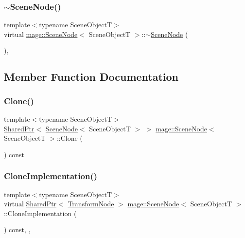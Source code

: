 \subsubsection{\texorpdfstring{$\sim$\+Scene\+Node()}{~SceneNode()}}
{\footnotesize\ttfamily template$<$typename Scene\+ObjectT$>$ \\
virtual \hyperlink{classmage_1_1_scene_node}{mage\+::\+Scene\+Node}$<$ Scene\+ObjectT $>$\+::$\sim$\hyperlink{classmage_1_1_scene_node}{Scene\+Node} (\begin{DoxyParamCaption}{ }\end{DoxyParamCaption})\hspace{0.3cm}{\ttfamily [virtual]}, {\ttfamily [default]}}



\subsection{Member Function Documentation}
\hypertarget{classmage_1_1_scene_node_a5cb20e0955c4afddcf7c2ecf79008e83}{}\label{classmage_1_1_scene_node_a5cb20e0955c4afddcf7c2ecf79008e83} 
\subsubsection{\texorpdfstring{Clone()}{Clone()}}
{\footnotesize\ttfamily template$<$typename Scene\+ObjectT$>$ \\
\hyperlink{namespacemage_a1e01ae66713838a7a67d30e44c67703e}{Shared\+Ptr}$<$ \hyperlink{classmage_1_1_scene_node}{Scene\+Node}$<$ Scene\+ObjectT $>$ $>$ \hyperlink{classmage_1_1_scene_node}{mage\+::\+Scene\+Node}$<$ Scene\+ObjectT $>$\+::Clone (\begin{DoxyParamCaption}{ }\end{DoxyParamCaption}) const}

\hypertarget{classmage_1_1_scene_node_a51ebb43d49e018665a181c863642a8bc}{}\label{classmage_1_1_scene_node_a51ebb43d49e018665a181c863642a8bc} 
\subsubsection{\texorpdfstring{Clone\+Implementation()}{CloneImplementation()}}
{\footnotesize\ttfamily template$<$typename Scene\+ObjectT$>$ \\
virtual \hyperlink{namespacemage_a1e01ae66713838a7a67d30e44c67703e}{Shared\+Ptr}$<$ \hyperlink{classmage_1_1_transform_node}{Transform\+Node} $>$ \hyperlink{classmage_1_1_scene_node}{mage\+::\+Scene\+Node}$<$ Scene\+ObjectT $>$\+::Clone\+Implementation (\begin{DoxyParamCaption}{ }\end{DoxyParamCaption}) const\hspace{0.3cm}{\ttfamily [override]}, {\ttfamily [private]}, {\ttfamily [virtual]}}



